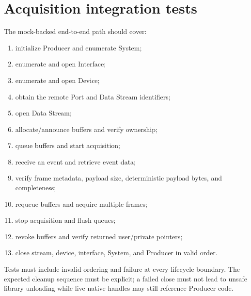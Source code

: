 \documentclass[11pt,a4paper]{report}
\begin{document}
\section{Acquisition integration tests}
The mock-backed end-to-end path should cover:
\begin{enumerate}
  \item initialize Producer and enumerate System;
  \item enumerate and open Interface;
  \item enumerate and open Device;
  \item obtain the remote Port and Data Stream identifiers;
  \item open Data Stream;
  \item allocate/announce buffers and verify ownership;
  \item queue buffers and start acquisition;
  \item receive an event and retrieve event data;
  \item verify frame metadata, payload size, deterministic payload bytes, and completeness;
  \item requeue buffers and acquire multiple frames;
  \item stop acquisition and flush queues;
  \item revoke buffers and verify returned user/private pointers;
  \item close stream, device, interface, System, and Producer in valid order.
\end{enumerate}

Tests must include invalid ordering and failure at every lifecycle boundary. The expected cleanup sequence must be explicit; a failed close must not lead to unsafe library unloading while live native handles may still reference Producer code.
\end{document}
